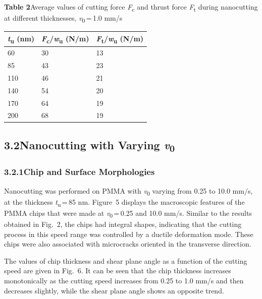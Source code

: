 \documentclass{article}
\begin{document}
\begin{center}
\noindent\textbf{Table 2}\quad Average values of cutting force \emph{F}\textsubscript{c} and thrust force \emph{F}\textsubscript{t} during nanocutting at different thicknesses, \emph{v}\textsubscript{0}\,=\,1.0 mm/s\par\medskip
\begin{tabular}{lll}
\toprule
\emph{t}\textsubscript{u} (nm) & \emph{F}\textsubscript{c}/\emph{w}\textsubscript{u} (N/m) & \emph{F}\textsubscript{t}/\emph{w}\textsubscript{u} (N/m) \\
\midrule
60 & 30 & 13 \\
85 & 43 & 23 \\
110 & 46 & 21 \\
140 & 54 & 20 \\
170 & 64 & 19 \\
200 & 68 & 19 \\
\bottomrule
\end{tabular}
\end{center}

\subsection*{3.2\quad Nanocutting with Varying \emph{v}\textsubscript{0}}

\subsubsection*{3.2.1\quad Chip and Surface Morphologies}

Nanocutting was performed on PMMA with \emph{v}\textsubscript{0} varying from 0.25 to 10.0 mm/s, at the thickness \emph{t}\textsubscript{u}\,=\,85 nm. Figure~5 displays the macroscopic features of the PMMA chips that were made at \emph{v}\textsubscript{0}\,=\,0.25 and 10.0 mm/s. Similar to the results obtained in Fig.~2, the chips had integral shapes, indicating that the cutting process in this speed range was controlled by a ductile deformation mode. These chips were also associated with microcracks oriented in the transverse direction.

The values of chip thickness and shear plane angle as a function of the cutting speed are given in Fig.~6. It can be seen that the chip thickness increases monotonically as the cutting speed increases from 0.25 to 1.0 mm/s and then decreases slightly, while the shear plane angle shows an opposite trend.
\end{document}

